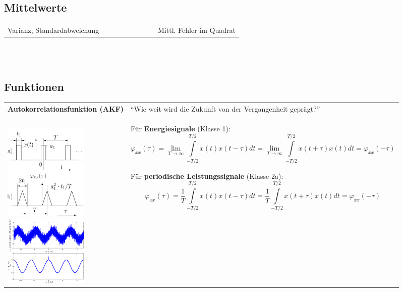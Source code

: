 \subsection{Mittelwerte }
\begin{tabular}{p{5cm}p{5.5cm}p{7.5cm}}

	Varianz, Standardabweichung
	& \fbox{$\text{Var}(x)=\sigma^2= \frac {1} {T} \int\limits_{-T/2}^{T/2}
	(x(t)-X_0)^2dt = X^2-X_0^2$}
	& $\qquad \qquad \qquad$ Mittl. Fehler im Quadrat
\end{tabular}
\\ \\	


\newpage
\subsection{Funktionen}
\begin{tabular}{ll}
\textbf{Autokorrelationsfunktion (AKF)}
	& ``Wie weit wird die Zukunft von der Vergangenheit geprägt?'' \\
\parbox{6cm}{
	\\
	\includegraphics[width=4cm]{./bilder/akf1.png}\\
	\includegraphics[width=4cm]{./bilder/akf2.png}
	} 
	& \parbox{12cm}{
	Für \textbf{Energiesignale} (Klasse 1):
	$$\varphi_{xx}(\tau) = \lim_{T\rightarrow\infty}\int\limits_{-T/2}^{T/2}
	x(t)x(t-\tau)dt=
	\lim_{T\rightarrow\infty}\int\limits_{-T/2}^{T/2} x(t+\tau)x(t)dt =
	\varphi_{xx}(-\tau)$$
	
	Für \textbf{periodische Leistungssignale} (Klasse 2a):
	$$\varphi_{xx}(\tau) = \frac {1} {T}
	\int\limits_{-T/2}^{T/2} x(t)x(t-\tau)dt 
	= \frac {1} {T} \int\limits_{-T/2}^{T/2} x(t+\tau)x(t)dt =
	\varphi_{xx}(-\tau)$$
	
}
\end{tabular}
